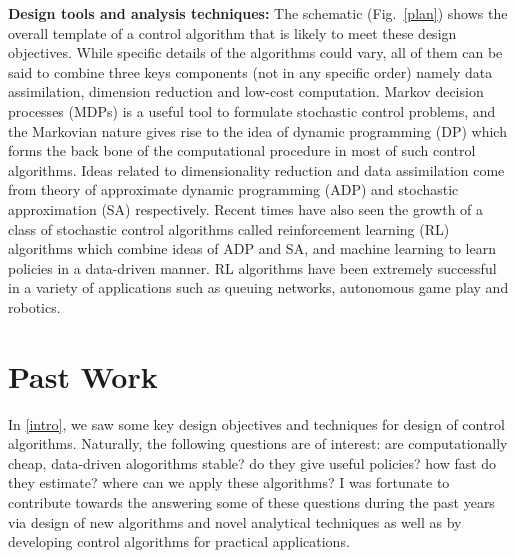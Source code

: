 \documentclass[onecolumn,12pt]{IEEEtran}
\begin{document}
\textbf{Design tools and analysis techniques:} The schematic (Fig.~\ref{plan}) shows the overall template of a control algorithm that is likely to meet these design objectives. %
While specific details of the algorithms could vary, all of them can be said to combine three keys components (not in any specific order) namely data assimilation, dimension reduction and low-cost computation. Markov decision processes (MDPs) is a useful tool to formulate stochastic control problems, and the Markovian nature gives rise to the idea of dynamic programming (DP) which forms the back bone of the computational procedure in most of such control algorithms. Ideas related to dimensionality reduction and data assimilation come from theory of approximate dynamic programming (ADP) and stochastic approximation (SA) respectively. Recent times have also seen the growth of a class of stochastic control algorithms called reinforcement learning (RL) algorithms which combine ideas of ADP and SA, and machine learning to learn policies in a data-driven manner. RL algorithms have been extremely successful in a variety of applications such as queuing networks, autonomous game play and robotics.


\section{Past Work}\label{past}
In \cref{intro}, we saw some key design objectives and techniques for design of control algorithms. Naturally, the following questions are of interest: are computationally cheap, data-driven alogorithms stable? do they give useful policies? how fast do they estimate? where can we apply these algorithms? I was fortunate to contribute towards the answering some of these questions during the past years via design of new algorithms and novel analytical techniques as well as by developing control algorithms for practical applications.
\end{document}
